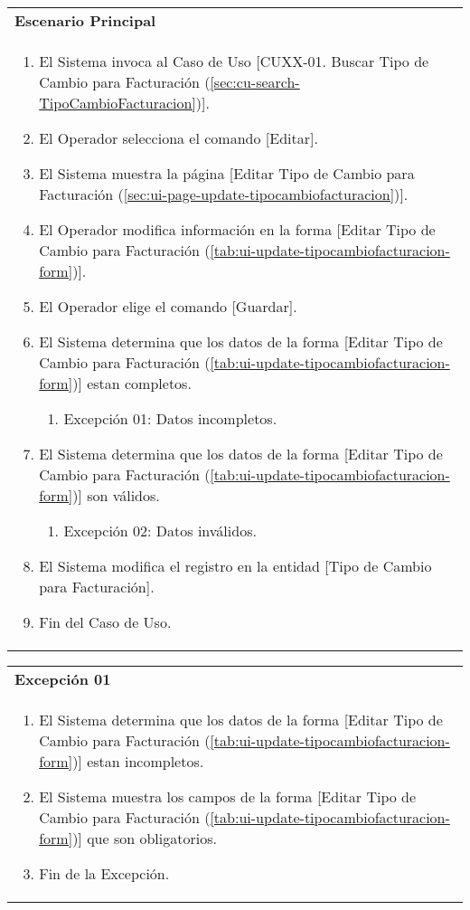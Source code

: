 \begin{tabular}{ p{15.5cm} }
	\textbf{Escenario Principal} \\
	\begin{enumerate}
		\item El Sistema invoca al Caso de Uso [CUXX-01. Buscar Tipo de Cambio para Facturación (\ref{sec:cu-search-TipoCambioFacturacion})].
		\item El Operador selecciona el comando [Editar].
		\item El Sistema muestra la página [Editar Tipo de Cambio para Facturación (\ref{sec:ui-page-update-tipocambiofacturacion})].
		\item El Operador modifica información en la forma [Editar Tipo de Cambio para Facturación (\ref{tab:ui-update-tipocambiofacturacion-form})].
		\item El Operador elige el comando [Guardar].
		\item El Sistema determina que los datos de la forma [Editar Tipo de Cambio para Facturación (\ref{tab:ui-update-tipocambiofacturacion-form})] estan completos.
			\begin{enumerate}
				\item Excepción 01: Datos incompletos.
			\end{enumerate}
		\item El Sistema determina que los datos de la forma [Editar Tipo de Cambio para Facturación (\ref{tab:ui-update-tipocambiofacturacion-form})] son válidos.
			\begin{enumerate}
				\item Excepción 02: Datos inválidos.
			\end{enumerate}
		\item El Sistema modifica el registro en la entidad [Tipo de Cambio para Facturación].
		\item Fin del Caso de Uso.
	\end{enumerate}
\end{tabular}

\begin{tabular}{ p{15.5cm} }
	\textbf{Excepción 01} \\
	\begin{enumerate}
		\item El Sistema determina que los datos de la forma [Editar Tipo de Cambio para Facturación (\ref{tab:ui-update-tipocambiofacturacion-form})] estan incompletos.
		\item El Sistema muestra los campos de la forma [Editar Tipo de Cambio para Facturación (\ref{tab:ui-update-tipocambiofacturacion-form})] que son obligatorios.
		\item Fin de la Excepción.
	\end{enumerate}
\end{tabular}


